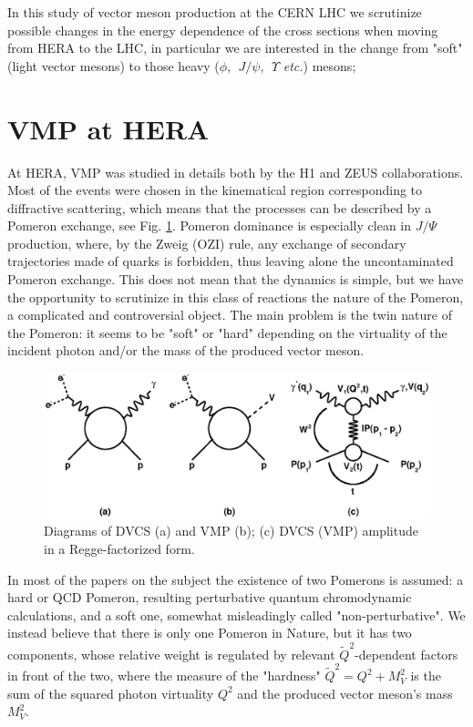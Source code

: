 \documentclass[12pt]{article}
\begin{document}
In this study of vector meson production at the CERN LHC we scrutinize possible changes in the energy dependence of the cross sections when moving from HERA to the LHC, in particular we are interested in the change from "soft" (light vector mesons) to those heavy ($\phi,\ \ J/\psi,\ \ \Upsilon$ {\it etc.}) mesons;

\section{VMP at HERA}
At HERA, VMP was studied in details both by the H1 and ZEUS collaborations. Most of the events were chosen in the 
kinematical region corresponding to diffractive scattering, which means that the processes can be described by a Pomeron exchange, see Fig. \ref{fig:diagrams}. Pomeron dominance is especially clean in $J/\Psi$ production, where,
by the Zweig (OZI) rule, any exchange of secondary trajectories made of quarks is forbidden, thus leaving alone the uncontaminated Pomeron exchange.  This does not mean that the dynamics is simple, but we have the opportunity 
to scrutinize in this class of reactions the nature of the Pomeron, a complicated and controversial object. 
The main problem is the twin nature of the Pomeron: it seems to be "soft" or "hard" depending on the virtuality of the incident photon and/or the mass of the produced vector meson.   
     
\begin{figure}[!h]
\centering
\includegraphics[width=.8\textwidth]{figures/diagrams.eps}
\caption{Diagrams of DVCS (a) and VMP (b); (c) DVCS (VMP) amplitude in a Regge-factorized form.}
\label{fig:diagrams}
\end{figure}

In most of the papers on the subject the existence of two Pomerons is assumed: a hard or QCD Pomeron, resulting
perturbative quantum chromodynamic calculations, and a soft one, somewhat misleadingly called "non-perturbative". 
We instead believe that there is only one Pomeron in Nature, but it has two components, whose relative weight is 
regulated by relevant $\tilde Q^2$-dependent factors in front of the two, where the measure of the "hardness" $\tilde Q^2=Q^2+M_V^2$ is the sum of the squared photon virtuality $Q^2$ and the produced vector meson's mass $M^2_V$.  
\end{document}
